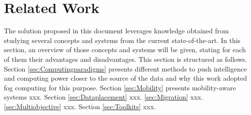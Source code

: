 \vfill
\pagebreak
\section{Related Work}
\label{sec:RelatedWork}

The solution proposed in this document leverages knowledge obtained from studying several concepts and systems from the current state-of-the-art. In this section, an overview of those concepts and systems will be given, stating for each of them their advantages and disadvantages. This section is structured as follows. Section \ref{sec:Computingparadigms} presents different methods to push intelligence and computing power closer to the source of the data and why this work adopted fog computing for this purpose. Section \ref{sec:Mobility} presents mobility-aware systems xxx. Section \ref{sec:Dataplacement} xxx. \ref{sec:Migration} xxx. \ref{sec:Multiobjective} xxx. Section \ref{sec:Toolkits} xxx.



